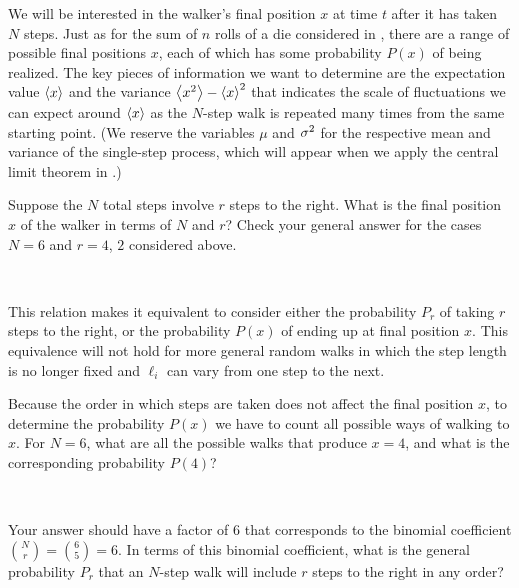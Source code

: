 We will be interested in the walker's final position $x$ at time $t$ after it has taken $N$ steps.
Just as for the sum of $n$ rolls of a die considered in , there are a range of possible final positions $x$, each of which has some probability $P(x)$ of being realized.
The key pieces of information we want to determine are the expectation value $\left\langle x \right\rangle$ and the variance $\left\langle x^2 \right\rangle - \left\langle x \right\rangle^2$ that indicates the scale of fluctuations we can expect around $\left\langle x \right\rangle$ as the $N$-step walk is repeated many times from the same starting point.
(We reserve the variables $\mu$ and $\sigma^2$ for the respective mean and variance of the single-step process, which will appear when we apply the central limit theorem in .)

Suppose the $N$ total steps involve $r$ steps to the right.
What is the final position $x$ of the walker in terms of $N$ and $r$?
Check your general answer for the cases $N = 6$ and $r = 4$, $2$ considered above.
\begin{mdframed}
  \ \\[80 pt]
\end{mdframed}
This relation makes it equivalent to consider either the probability $P_r$ of taking $r$ steps to the right, or the probability $P(x)$ of ending up at final position $x$.
This equivalence will not hold for more general random walks in which the step length is no longer fixed and $\ell_i$ can vary from one step to the next.

Because the order in which steps are taken does not affect the final position $x$, to determine the probability $P(x)$ we have to count all possible ways of walking to $x$.
For $N = 6$, what are all the possible walks that produce $x = 4$, and what is the corresponding probability $P(4)$?
\begin{mdframed}
  \ \\[100 pt]
\end{mdframed}
Your answer should have a factor of $6$ that corresponds to the binomial coefficient $\binom{N}{r} = \binom{6}{5} = 6$.
In terms of this binomial coefficient, what is the general probability $P_r$ that an $N$-step walk will include $r$ steps to the right in any order?
\begin{mdframed}
  \ \\[80 pt]
\end{mdframed}


